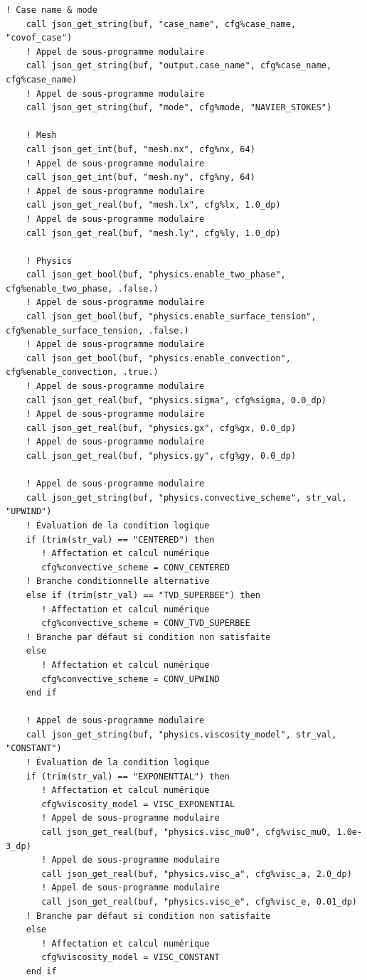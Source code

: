 \documentclass[10pt,a4paper,oneside]{book}
\begin{document}
\begin{lstlisting}[language={[95]Fortran}]
    ! Case name & mode
    call json_get_string(buf, "case_name", cfg%case_name, "covof_case")
    ! Appel de sous-programme modulaire
    call json_get_string(buf, "output.case_name", cfg%case_name, cfg%case_name)
    ! Appel de sous-programme modulaire
    call json_get_string(buf, "mode", cfg%mode, "NAVIER_STOKES")

    ! Mesh
    call json_get_int(buf, "mesh.nx", cfg%nx, 64)
    ! Appel de sous-programme modulaire
    call json_get_int(buf, "mesh.ny", cfg%ny, 64)
    ! Appel de sous-programme modulaire
    call json_get_real(buf, "mesh.lx", cfg%lx, 1.0_dp)
    ! Appel de sous-programme modulaire
    call json_get_real(buf, "mesh.ly", cfg%ly, 1.0_dp)

    ! Physics
    call json_get_bool(buf, "physics.enable_two_phase", cfg%enable_two_phase, .false.)
    ! Appel de sous-programme modulaire
    call json_get_bool(buf, "physics.enable_surface_tension", cfg%enable_surface_tension, .false.)
    ! Appel de sous-programme modulaire
    call json_get_bool(buf, "physics.enable_convection", cfg%enable_convection, .true.)
    ! Appel de sous-programme modulaire
    call json_get_real(buf, "physics.sigma", cfg%sigma, 0.0_dp)
    ! Appel de sous-programme modulaire
    call json_get_real(buf, "physics.gx", cfg%gx, 0.0_dp)
    ! Appel de sous-programme modulaire
    call json_get_real(buf, "physics.gy", cfg%gy, 0.0_dp)

    ! Appel de sous-programme modulaire
    call json_get_string(buf, "physics.convective_scheme", str_val, "UPWIND")
    ! Évaluation de la condition logique
    if (trim(str_val) == "CENTERED") then
       ! Affectation et calcul numérique
       cfg%convective_scheme = CONV_CENTERED
    ! Branche conditionnelle alternative
    else if (trim(str_val) == "TVD_SUPERBEE") then
       ! Affectation et calcul numérique
       cfg%convective_scheme = CONV_TVD_SUPERBEE
    ! Branche par défaut si condition non satisfaite
    else
       ! Affectation et calcul numérique
       cfg%convective_scheme = CONV_UPWIND
    end if

    ! Appel de sous-programme modulaire
    call json_get_string(buf, "physics.viscosity_model", str_val, "CONSTANT")
    ! Évaluation de la condition logique
    if (trim(str_val) == "EXPONENTIAL") then
       ! Affectation et calcul numérique
       cfg%viscosity_model = VISC_EXPONENTIAL
       ! Appel de sous-programme modulaire
       call json_get_real(buf, "physics.visc_mu0", cfg%visc_mu0, 1.0e-3_dp)
       ! Appel de sous-programme modulaire
       call json_get_real(buf, "physics.visc_a", cfg%visc_a, 2.0_dp)
       ! Appel de sous-programme modulaire
       call json_get_real(buf, "physics.visc_e", cfg%visc_e, 0.01_dp)
    ! Branche par défaut si condition non satisfaite
    else
       ! Affectation et calcul numérique
       cfg%viscosity_model = VISC_CONSTANT
    end if


\end{lstlisting}
\end{document}
